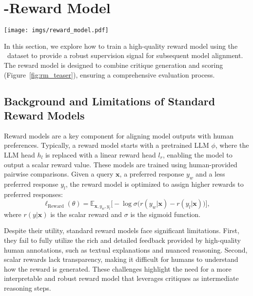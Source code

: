 
\section{\abbr-Reward Model}

\begin{figure*}
    \centering
    \texttt{[image: imgs/reward\_model.pdf]}
    \caption{\textbf{Illustration of the multi-task reward model training process.} The process begins with a user query and corresponding model responses, which are ranked and annotated by humans. Human annotations are expanded using GPT-4o to provide enhanced rationales. The reward model is trained with two objectives: (1) \textit{Learning to Provide Critique}, where the model learns to provide detailed critiques and evaluations for model responses, and (2) \textit{Learning Scoring}, where the model learns to assign scores based on the model response and critique. The integration of these tasks ensures a robust evaluation framework for improving model outputs.}
    \label{fig:rm_teaser}
\end{figure*}
In this section, we explore how to train a high-quality reward model using the \abbr~dataset to provide a robust supervision signal for subsequent model alignment. The reward model is designed to combine critique generation and scoring (Figure~\ref{fig:rm_teaser}), ensuring a comprehensive evaluation process.
\subsection{Background and Limitations of Standard Reward Models}

Reward models are a key component for aligning model outputs with human preferences. Typically, a reward model starts with a pretrained LLM $\phi$, where the LLM head $h_l$ is replaced with a linear reward head $l_r$, enabling the model to output a scalar reward value. These models are trained using human-provided pairwise comparisons. Given a query $\mathbf{x}$, a preferred response $y_w$ and a less preferred response $y_l$, the reward model is optimized to assign higher rewards to preferred responses:
\begin{equation}
\ell_{\text{Reward}}(\theta) = 
\mathbb{E}_{\mathbf{x}, y_w, y_l} 
\Big[ 
    - \log \sigma \Big( r(y_w | \mathbf{x}) - r(y_l | \mathbf{x}) \Big)
\Big],
\end{equation}
where $r(y | \mathbf{x})$ is the scalar reward and $\sigma$ is the sigmoid function.

Despite their utility, standard reward models face significant limitations. First, they fail to fully utilize the rich and detailed feedback provided by high-quality human annotations, such as textual explanations and nuanced reasoning. Second, scalar rewards lack transparency, making it difficult for humans to understand how the reward is generated. These challenges highlight the need for a more interpretable and robust reward model that leverages critiques as intermediate reasoning steps.

